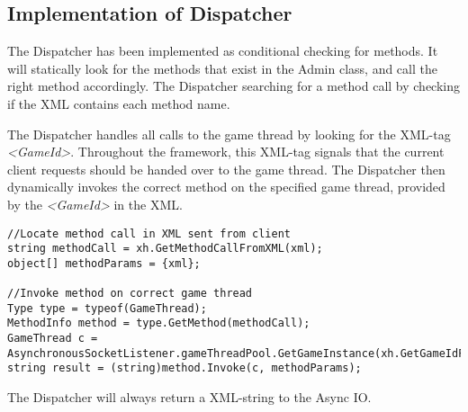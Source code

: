 \subsection{Implementation of Dispatcher}
\label{chap:dispImplementation}
The Dispatcher has been implemented as conditional checking for methods. It will statically look for the methods that exist in the Admin class, and call the right method accordingly. The Dispatcher searching for a method call by checking if the XML contains each method name.

The Dispatcher handles all calls to the game thread by looking for the XML-tag \textit{<GameId>}. Throughout the framework, this XML-tag signals that the current client requests should be handed over to the game thread. The Dispatcher then dynamically invokes the correct method on the specified game thread, provided by the \textit{<GameId>} in the XML. 

\begin{lstlisting}[caption={Dynamically invoking methods on game threads}]
//Locate method call in XML sent from client
string methodCall = xh.GetMethodCallFromXML(xml);
object[] methodParams = {xml};

//Invoke method on correct game thread
Type type = typeof(GameThread);
MethodInfo method = type.GetMethod(methodCall);
GameThread c = AsynchronousSocketListener.gameThreadPool.GetGameInstance(xh.GetGameIdFromXML(xml));
string result = (string)method.Invoke(c, methodParams);
\end{lstlisting}

The Dispatcher will always return a XML-string to the Async IO.